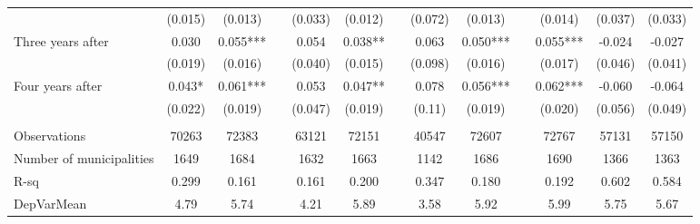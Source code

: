 \begin{tabular}{lcccccccccccc}
      & (0.015) & (0.013) &       & (0.033) & (0.012) &       & (0.072) & (0.013) &       & (0.014) & (0.037) & (0.033) \\
Three years after & 0.030 & 0.055*** &       & 0.054 & 0.038** &       & 0.063 & 0.050*** &       & 0.055*** & -0.024 & -0.027 \\
      & (0.019) & (0.016) &       & (0.040) & (0.015) &       & (0.098) & (0.016) &       & (0.017) & (0.046) & (0.041) \\
Four years after & 0.043* & 0.061*** &       & 0.053 & 0.047** &       & 0.078 & 0.056*** &       & 0.062*** & -0.060 & -0.064 \\
      & (0.022) & (0.019) &       & (0.047) & (0.019) &       & (0.11) & (0.019) &       & (0.020) & (0.056) & (0.049) \\
      &       &       &       &       &       &       &       &       &       &       &       &  \\
Observations & 70263 & 72383 &       & 63121 & 72151 &       & 40547 & 72607 &       & 72767 & 57131 & 57150 \\
Number of municipalities & 1649  & 1684  &       & 1632  & 1663  &       & 1142  & 1686  &       & 1690  & 1366  & 1363 \\
R-sq  & 0.299 & 0.161 &       & 0.161 & 0.200 &       & 0.347 & 0.180 &       & 0.192 & 0.602 & 0.584 \\
DepVarMean & 4.79  & 5.74  &       & 4.21  & 5.89  &       & 3.58  & 5.92  &       & 5.99  & 5.75  & 5.67 \\
\bottomrule
\bottomrule
\end{tabular}%
